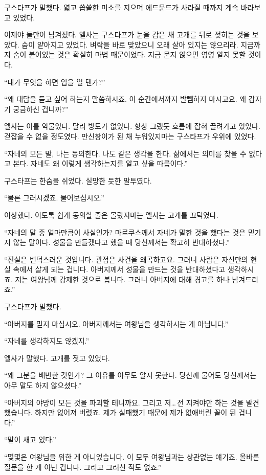구스타프가 말했다. 엷고 씁쓸한 미소를 지으며 에드문드가 사라질 때까지 계속 바라보고 있었다.

이제야 둘만이 남겨졌다. 엘사는 구스타프가 눈을 감은 채 고개를 뒤로 젖히는 것을 보았다. 숨이 얕아지고 있었다. 벼락을 바로 맞았으니 오래 살아 있지는 않으리라. 지금까지 숨이 붙어있는 것은 확실히 마법 때문이었다. 지금 묻지 않으면 영영 알지 못할 것이다.

``내가 무엇을 하면 입을 열 텐가?''

``왜 대답을 듣고 싶어 하는지 말씀하시죠. 이 순간에서까지 발뺌하지 마시고요. 왜 갑자기 궁금하신 겁니까?''

엘사는 이를 악물었다. 달리 방도가 없었다. 항상 그랬듯 흐름에 잡혀 끌려가고 있었다. 걷잡을 수 없을 정도였다. 만신창이가 된 채 누워있지마는 구스타프가 우위에 있었다.

``자네의 모든 말, 나는 동의한다. 나도 같은 생각을 한다. 삶에서는 의미를 찾을 수 없다고 본다. 자네도 왜 이렇게 생각하는지를 알고 싶을 따름이다.''

구스타프는 한숨을 쉬었다. 실망한 듯한 말투였다.

``물론 그러시겠죠. 물어보십시오.''

이상했다. 이토록 쉽게 동의할 줄은 몰랐지마는 엘사는 고개를 끄덕였다.

``자네의 말 중 얼마만큼이 사실인가? 마르쿠스께서 자네가 말한 것을 했다는 것은 믿기지 않는 말이다. 성물을 만들겠다고 했을 때 당신께서는 확고히 반대하셨다.''

``진실은 변덕스러운 것입니다. 관점은 사건을 왜곡하고요. 그러니 사람은 자신만의 현실 속에서 살게 되는 겁니다. 아버지께서 성물을 만드는 것을 반대하셨다고 생각하시죠. 저는 여왕님께 강제한 것으로 봅니다. 그러니 아버지에 대해 경고를 하나 남겨드리죠.''

구스타프가 말했다.

``아버지를 믿지 마십시오. 아버지께서는 여왕님을 생각하시는 게 아닙니다.''

``자네를 생각하지도 않겠지.''

엘사가 말했다. 고개를 젓고 있었다.

``왜 그분을 배반한 것인가? 그 이유를 아무도 알지 못한다. 당신께 물어도 당신께서는 아무 말도 하지 않으셨다.''

``아버지의 야망이 모든 것을 파괴할 테니까요. 그리고 저\ldots\,전 지켜야만 하는 것을 발견했습니다. 하지만 없어져 버렸죠. 제가 실패했기 때문에 제가 없애버린 꼴이 된 겁니다.''

``말이 새고 있다.''

``몇몇은 여왕님을 위한 게 아니었습니다. 이 모두 여왕님과는 상관없는 얘기죠. 올바른 질문을 한 게 아닌 겁니다. 그리고 그러신 적도 없죠.''


